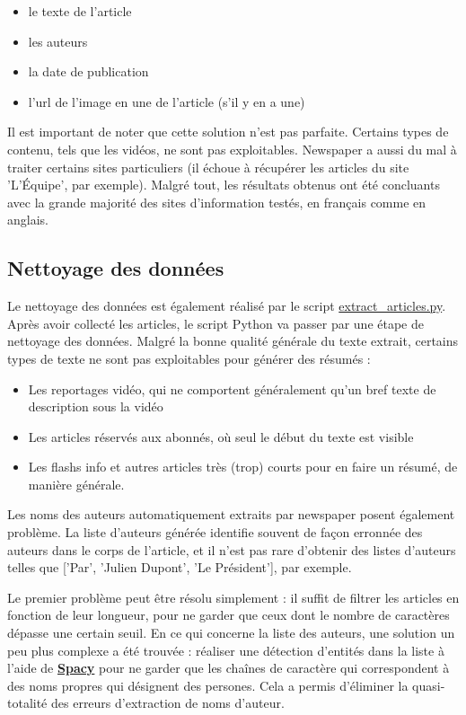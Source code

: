 \documentclass[french]{article}
\begin{document}
    \begin{itemize}
        \item le texte de l'article
        \item les auteurs
        \item la date de publication
        \item l'url de l'image en une de l'article (s'il y en a une)
    \end{itemize}
    Il est important de noter que cette solution n'est pas parfaite. Certains types de contenu, tels que les vidéos, ne sont pas exploitables. Newspaper a aussi du mal à traiter certains sites particuliers (il échoue à récupérer les articles du site 'L'Équipe', par exemple). Malgré tout, les résultats obtenus ont été concluants avec la grande majorité des sites d'information testés, en français comme en anglais.

    \subsection{Nettoyage des données}
    Le nettoyage des données est également réalisé par le script \href{https://github.com/vinpap/your_news_anchor/blob/main/extract_articles.py}{extract\_articles.py}.
    Après avoir collecté les articles, le script Python va passer par une étape de nettoyage des données. Malgré la bonne qualité générale du texte extrait, certains types de texte ne sont pas exploitables pour générer des résumés :
    \begin{itemize}
        \item Les reportages vidéo, qui ne comportent généralement qu'un bref texte de description sous la vidéo
        \item Les articles réservés aux abonnés, où seul le début du texte est visible
        \item Les flashs info et autres articles très (trop) courts pour en faire un résumé, de manière générale.
    \end{itemize}
    Les noms des auteurs automatiquement extraits par newspaper posent également problème. La liste d'auteurs générée identifie souvent de façon erronnée des auteurs dans le corps de l'article, et il n'est pas rare d'obtenir des listes d'auteurs telles que ['Par', 'Julien Dupont', 'Le Président'], par exemple.

    Le premier problème peut être résolu simplement : il suffit de filtrer les articles en fonction de leur longueur, pour ne garder que ceux dont le nombre de caractères dépasse une certain seuil.
    En ce qui concerne la liste des auteurs, une solution un peu plus complexe a été trouvée : réaliser une détection d'entités dans la liste à l'aide de \textbf{\href{https://spacy.io/}{Spacy}} pour ne garder que les chaînes de caractère qui correspondent à des noms propres qui désignent des persones. Cela a permis d'éliminer la quasi-totalité des erreurs d'extraction de noms d'auteur.
    
\end{document}

